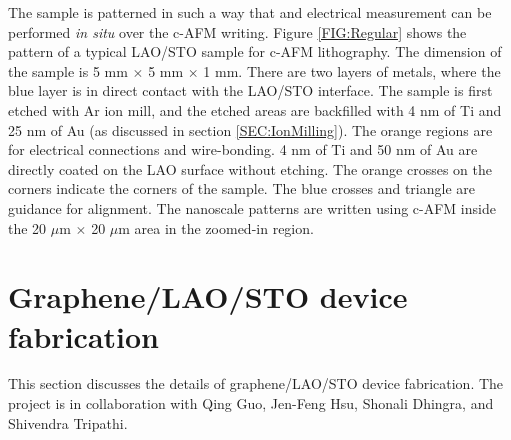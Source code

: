 \documentclass[pdflatex, sectionletters, 12pt]{pittetd}    %
\begin{document}
The sample is patterned in such a way that and electrical measurement can be performed \textit{in situ} over the c-AFM writing. Figure \ref{FIG:Regular} shows the pattern of a typical LAO/STO sample for c-AFM lithography. The dimension of the sample is 5 mm $\times$ 5 mm $\times$ 1 mm. There are two layers of metals, where the blue layer is in direct contact with the LAO/STO interface. The sample is first etched with Ar ion mill, and the etched areas are backfilled with 4 nm of Ti and 25 nm of Au (as discussed in section \ref{SEC:IonMilling}). The orange regions are for electrical connections and wire-bonding. 4 nm of Ti and 50 nm of Au are directly coated on the LAO surface without etching. The orange crosses on the corners indicate the corners of the sample. The blue crosses and triangle are guidance for alignment. The nanoscale patterns are written using c-AFM inside the 20 $\mu$m $\times$ 20 $\mu$m area in the zoomed-in region.






\section{Graphene/LAO/STO device fabrication}

This section discusses the details of graphene/LAO/STO device fabrication. The project is in collaboration with Qing Guo, Jen-Feng Hsu, Shonali Dhingra, and Shivendra Tripathi.
\end{document}
